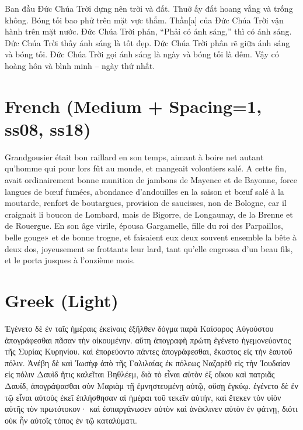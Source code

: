 \documentclass[12pt,letterpaper,openany]{book}
\begin{document}
{\large Ban đầu Ðức Chúa Trời dựng nên trời và đất. Thuở ấy đất hoang vắng và trống không. Bóng tối bao phử trên mặt vực thẳm. Thần[a] của Ðức Chúa Trời vận hành trên mặt nước. Ðức Chúa Trời phán, “Phải có ánh sáng,” thì có ánh sáng. Ðức Chúa Trời thấy ánh sáng là tốt đẹp. Ðức Chúa Trời phân rẽ giữa ánh sáng và bóng tối. Ðức Chúa Trời gọi ánh sáng là ngày và bóng tối là đêm. Vậy có hoàng hôn và bình minh – ngày thứ nhất.}

\section{French (Medium + Spacing=1, ss08, ss18)}

{\mediumspaced{}\large Grandgousier était bon raillard en son temps,
aimant à boire net autant qu’homme qui pour lors fût
au monde, et mangeait volontiers salé. A cette fin,
avait ordinairement bonne munition de jambons de Mayence
et de Bayonne, force langues de bœuf fumées, abondance
d’andouilles en la saison et bœuf salé à la moutarde, renfort de
boutargues, provision de saucisses, non de Bologne, car il
craignait li boucon de Lombard, mais de Bigorre, de Longaunay,
de la Brenne et de Rouergue. En son âge virile, épousa
Gargamelle, fille du roi des Parpaillos, belle gouge» et de bonne
trogne, et faisaient eux deux souvent ensemble la bête à deux
dos, joyeusement se frottants leur lard, tant qu’elle engrossa
d’un beau fils, et le porta jusques à l’onzième mois.}

\section{Greek (Light)}

{\light\large{} Ἐγένετο δὲ ἐν ταῖς ἡμέραις ἐκείναις ἐξῆλθεν δόγμα παρὰ Καίσαρος 
Αὐγούσ\-του ἀπογράφεσθαι πᾶσαν τὴν οἰκουμένην. αὕτη ἀπογραφὴ πρώτη 
ἐγένετο ἡγε\-μονεύοντος τῆς Συρίας Κυρηνίου. καὶ ἐπορεύοντο πάντες 
ἀπογράφεσθαι, ἕκαστος εἰς τὴν ἑαυτοῦ πόλιν. Ἀνέβη δὲ καὶ Ἰωσὴφ ἀπὸ 
τῆς Γαλιλαίας ἐκ πόλεως Ναζαρὲθ εἰς τὴν Ἰουδαίαν εἰς πόλιν Δαυὶδ 
ἥτις καλεῖται Βηθλέεμ, διὰ τὸ εἶναι αὐτὸν ἐξ οἴκου καὶ πατριᾶς Δαυίδ,
ἀπογράψασθαι σὺν Μαριὰμ τῇ ἐμνηστευμένῃ αὐτῷ, οὔσῃ ἐγκύῳ. ἐγένετο δὲ 
ἐν τῷ εἶναι αὐτοὺς ἐκεῖ ἐπλήσθησαν αἱ ἡμέραι τοῦ τεκεῖν αὐτήν, καὶ 
ἔτεκεν τὸν υἱὸν αὐτῆς τὸν πρωτότοκον· καὶ ἐσπαργάνωσεν αὐτὸν καὶ 
ἀνέκλινεν αὐτὸν ἐν φάτνῃ, διότι οὐκ ἦν αὐτοῖς τόπος ἐν τῷ καταλύματι.}
\end{document}
